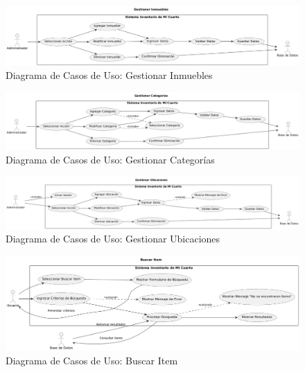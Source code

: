 \documentclass{article}
\begin{document}
\begin{figure}[H]
    \centering
    \includegraphics[width=\textwidth]{img/GestionarInmuebles.png}
    \caption{Diagrama de Casos de Uso: Gestionar Inmuebles}
\end{figure}

\begin{figure}[H]
    \centering
    \includegraphics[width=\textwidth]{img/GestionarCategorias.png}
    \caption{Diagrama de Casos de Uso: Gestionar Categorías}
\end{figure}

\begin{figure}[H]
    \centering
    \includegraphics[width=\textwidth]{img/GestionarUbicaciones.png}
    \caption{Diagrama de Casos de Uso: Gestionar Ubicaciones}
\end{figure}

\begin{figure}[H]
    \centering
    \includegraphics[width=\textwidth]{img/BuscarItem.png}
    \caption{Diagrama de Casos de Uso: Buscar Item}
\end{figure}

\end{document}
